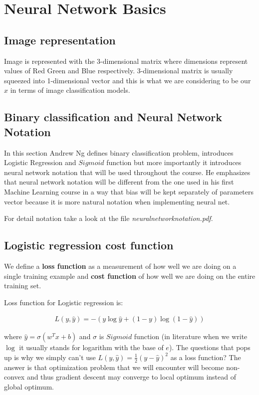 \documentclass[a4paper]{report}
\begin{document}
\section{Neural Network Basics}

\subsection{Image representation}
Image is represented with the 3-dimensional matrix where dimensions represent values of Red Green and Blue respectively. 3-dimensional matrix is usually squeezed into 1-dimensional vector and this is what we are considering to be our $x$ in terms of image classification models.

\subsection{Binary classification and Neural Network Notation}
In this section Andrew Ng defines binary classification problem, introduces Logistic Regression and $Sigmoid$ function but more importantly it introduces neural network notation that will be used throughout the course. He emphasizes that neural network notation will be different from the one used in his first Machine Learning course in a way that bias will be kept separately of parameters vector because it is more natural notation when implementing neural net.

For detail notation take a look at the file \textit{neuralnetworknotation.pdf}.

\subsection{Logistic regression cost function}
We define a \textbf{loss function} as a measurement of how well we are doing on a single training example and \textbf{cost function} of how well we are doing on the entire training set.

Loss function for Logistic regression is:

\begin{align}
L(y, \hat{y}) = -(y\log{\hat{y}} + (1 - y)\log{(1 - \hat{y})})
\end{align}

where $\hat{y} = \sigma(w^Tx + b)$ and $\sigma$ is $Sigmoid$ function (in literature when we write $\log$ it usually stands for logarithm with the base of $e$). The questions that pops up is why we simply can't use $L(y, \hat{y}) = \frac{1}{2}(y - \hat{y})^2$ as a loss function? The answer is that optimization problem that we will encounter will become non-convex and thus gradient descent may converge to local optimum instead of global optimum.
\end{document}
